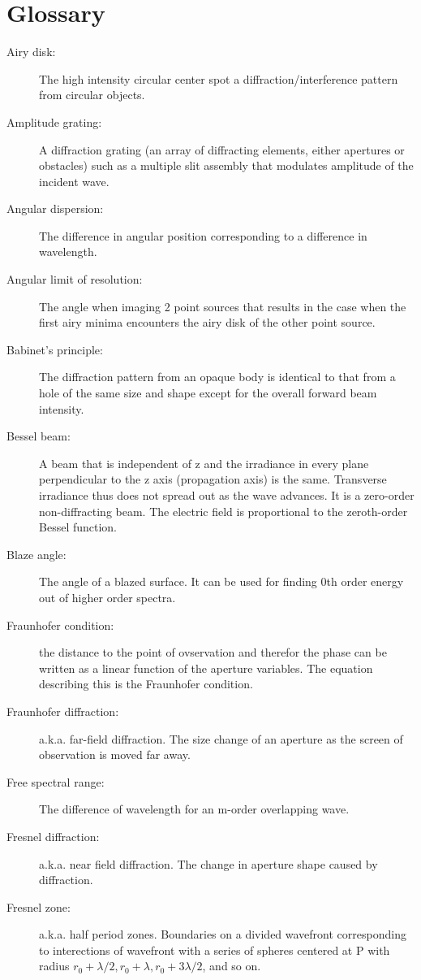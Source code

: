 \documentclass[12pt]{report}
\begin{document}
\section{Glossary}
\begin{description}
\item[Airy disk: ] The high intensity circular center spot a diffraction/interference pattern from circular objects. 
\item[Amplitude grating: ] A diffraction grating (an array of diffracting elements, either apertures or obstacles) such as a multiple slit assembly that modulates amplitude of the incident wave. 
\item[Angular dispersion: ] The difference in angular position corresponding to a difference in wavelength. 
\item[Angular limit of resolution: ] The angle when imaging 2 point sources that results in the case when the first airy minima encounters the airy disk of the other point source. 
\item[Babinet's principle: ] The diffraction pattern from an opaque body is identical to that from a hole of the same size and shape except for the overall forward beam intensity. 
\item[Bessel beam: ] A beam that is independent of z and the irradiance in every plane perpendicular to the z axis (propagation axis) is the same. Transverse irradiance thus does not spread out as the wave advances. It is a zero-order non-diffracting beam. The electric field is proportional to the zeroth-order Bessel function. 
\item[Blaze angle: ] The angle of a blazed surface. It can be used for finding 0th order energy out of higher order spectra. 
\item[Fraunhofer condition: ] the distance to the point of ovservation and therefor the phase can be written as a linear function of the aperture variables. The equation describing this is the Fraunhofer condition. 
\item[Fraunhofer diffraction: ] a.k.a. far-field diffraction. The size change of an aperture as the screen of observation is moved far away. 
\item[Free spectral range: ] The difference of wavelength for an m-order overlapping wave. 
\item[Fresnel diffraction: ] a.k.a. near field diffraction. The change in aperture shape caused by diffraction. 
\item[Fresnel zone: ] a.k.a. half period zones. Boundaries on a divided wavefront corresponding to interections of wavefront with a series of spheres centered at P with radius $r_0 +\lambda/2, r_0+\lambda, r_0+3\lambda/2$, and so on. 

\end{description}
\end{document}
